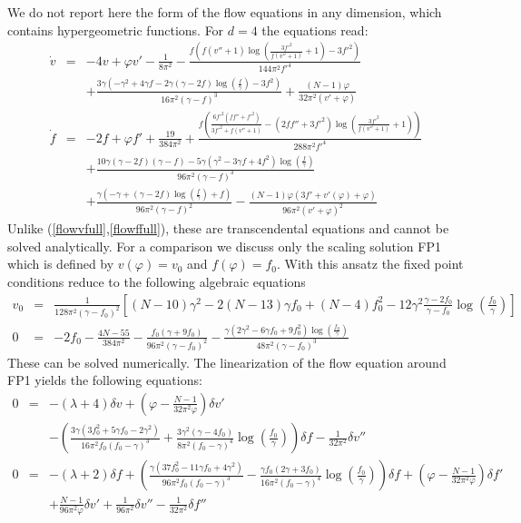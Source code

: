 \documentclass[11pt]{book} %
\newcommand{\bea}{\begin{eqnarray}}
\newcommand{\eea}{\end{eqnarray}}
\newcommand{\nn}{\nonumber}
\begin{document}
We do not report here the form of the flow equations in any dimension,
which contains hypergeometric functions.
For $d=4$ the equations read:
\bea
\dot v&=&-4v+\varphi v'-\frac{1}{8\pi^2}
-\frac{f\left(f(v''+1)\log\left(\frac{3 f'^2}{f(v''+1)}+1\right)-3 f'^2\right)}{144\pi^2f'^4}
\nn\\
&&
+\frac{3\gamma\left(-\gamma^2+4\gamma f-2\gamma(\gamma-2f)\log \left(\frac{f}{\gamma}\right)
-3 f^2\right)}{16 \pi ^2 (\gamma
   -f)^3}+\frac{(N-1) \varphi }{32 \pi ^2 \left(v'+\varphi \right)}
\\
\dot f&=&-2f+\varphi f'+\frac{19}{384\pi^2}
+\frac{f\left(\frac{6f'^2\left(f f''+f'^2\right)}{3f'^2+f\left(v''+1\right)}
-\left(2 f f''+3 f'^2\right)
\log\left(\frac{3 f'^2}{f(v''+1)}+1\right)\right)}{288 \pi ^2 f'^4}
   \nn\\&&
   +\frac{10 \gamma  (\gamma -2 f) (\gamma -f)-5
   \gamma  \left(\gamma ^2-3 \gamma  f+4 f^2\right) \log \left(\frac{f}{\gamma }\right)}{96
   \pi ^2 (\gamma -f)^3}
\nn\\&&
+\frac{\gamma\left(-\gamma +(\gamma-2f)\log\left(\frac{f}{\gamma}\right)+f\right)}{96\pi^2(\gamma-f)^2}
-\frac{(N-1) \varphi  \left(3 f'+v'(\varphi )+\varphi \right)}{96 \pi ^2 \left(v'+\varphi\right)^2}
\eea
Unlike (\ref{flowvfull},\ref{flowffull}),
these are transcendental equations and cannot be solved analytically.
For a comparison we discuss
only the  scaling solution FP1
which is defined by $v(\varphi)=v_0$ and $f(\varphi)=f_0$.
With this ansatz the fixed point conditions reduce to
the following algebraic equations
\bea
\label{eqpureFP1}
v_0&=&\frac{1}{128\pi^2(\gamma-f_0)^2}\left[
(N-10)\gamma^2-2(N-13)\gamma f_0+(N-4)f_0^2
-12\gamma^2\frac{\gamma-2f_0}{\gamma-f_0}\log\left(\frac{f_0}{\gamma}\right) \right]
\nonumber\\
0&=& -2f_0-\frac{4N-55}{384\pi^2}
-\frac{f_0(\gamma+9f_0)}{96\pi^2(\gamma-f_0)^2}
-\frac{\gamma\left(2\gamma^2-6\gamma f_0+9f_0^2\right)
\log\left(\frac{f_0}{\gamma}\right)}{48\pi^2(\gamma-f_0)^3}
\eea
These can be solved numerically.
The linearization of the flow equation around FP1 yields the following
equations:
\bea
0&=&
-(\lambda+4)\delta v
+\left(\varphi-\frac{N-1}{32\pi^2\varphi}\right)\delta v'
\nn\\
&&
-\left(\frac{3\gamma\left(3f_0^2+5\gamma f_0-2\gamma^2\right)}
{16\pi^2f_0(f_0-\gamma)^3}
+\frac{3 \gamma ^2 (\gamma -4f_0)}{8\pi^2(f_0-\gamma)^4}\log\left(\frac{f_0}{\gamma}\right)\right)\delta f
-\frac{1}{32\pi^2}\delta v''
\\
0&=& -(\lambda +2)\delta f
+\left(\frac{\gamma\left(37 f_0^2-11\gamma f_0+4\gamma^2\right)}
{96\pi^2 f_0(f_0-\gamma)^3}
-\frac{\gamma f_0(2\gamma+3f_0)}{16\pi^2(f_0-\gamma)^4}
\log\left(\frac{f_0}{\gamma }\right)\right)\delta f
+\left(\varphi-\frac{N-1}{32\pi^2\varphi}\right)\delta f'
\nn\\
&&
+\frac{N-1}{96\pi^2\varphi}\delta v'
+\frac{1}{96\pi^2}\delta v''
-\frac{1}{32\pi^2}\delta f''
\eea
\end{document}
